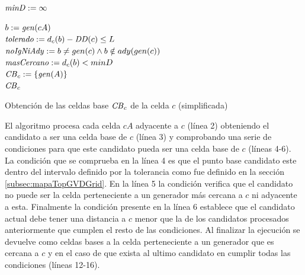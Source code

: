 \begin{algorithm}[H]
\SetAlgoLined


  $\mathit{minD} := \infty$

   {
    $b := \mathit{gen}(cA)$\\
    $\mathit{tolerado} := d_c(b) - \mathit{DD}(c) \leq L$\\
    $\mathit{noIgNiAdy} := b \neq gen(c) \land b \notin ady(gen(c))$\\
    $\mathit{masCercano} := d_c(b) < minD$\\
  }
  $\mathit{CB}_c := \{\mathit{gen}(A)\}$\\
  \Return $\mathit{CB}_c$ 

  \caption{Obtención de las celdas base $\mathit{CB}_c$ de la celda $c$ (simplificada)}
  \label{alg:celdasBase}
\end{algorithm}

El algoritmo procesa cada celda $cA$ adyacente a $c$ (línea 2) obteniendo el
candidato a ser una celda base de $c$ (línea 3) y comprobando una serie de
condiciones para que este candidato pueda ser una celda base de $c$ (líneas
4-6). La condición que se comprueba en la línea 4 es que el punto base
candidato este dentro del intervalo definido por la tolerancia como fue
definido en la sección \ref{subsec:mapaTopGVDGrid}. En la línea 5 la condición
verifica que el candidato no puede ser la celda perteneciente a un generador
más cercana a $c$ ni adyacente a esta. Finalmente la condición presente en la
línea 6 establece que el candidato actual debe tener una distancia a $c$ menor
que la de los candidatos procesados anteriormente que cumplen el resto de las
condiciones. Al finalizar la ejecución se devuelve como celdas bases a la celda
perteneciente a un generador que es cercana a $c$ y en el caso de que exista al
ultimo candidato en cumplir todas las condiciones (líneas 12-16).


